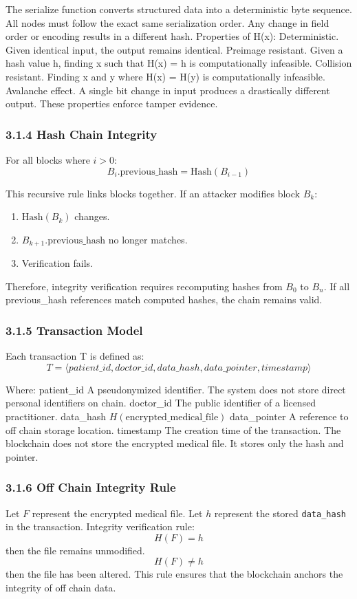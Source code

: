 The serialize function converts structured data into a deterministic byte sequence.
All nodes must follow the exact same serialization order.
Any change in field order or encoding results in a different hash.
Properties of H(x):
Deterministic.
Given identical input, the output remains identical.
Preimage resistant.
Given a hash value h, finding x such that H(x) = h is computationally infeasible.
Collision resistant.
Finding x and y where H(x) = H(y) is computationally infeasible.
Avalanche effect.
A single bit change in input produces a drastically different output.
These properties enforce tamper evidence.

\subsubsection*{3.1.4 Hash Chain Integrity}
For all blocks where $i > 0$:
\[
B_i.\text{previous\_hash} = \mathrm{Hash}(B_{i-1})
\]

This recursive rule links blocks together.
If an attacker modifies block $B_k$:
\begin{enumerate}
\item $\mathrm{Hash}(B_k)$ changes.
\item $B_{k+1}.\text{previous\_hash}$ no longer matches.
\item Verification fails.
\end{enumerate}

Therefore, integrity verification requires recomputing hashes from $B_0$ to $B_n$.
If all previous_hash references match computed hashes, the chain remains valid.

\subsubsection*{3.1.5 Transaction Model}
Each transaction T is defined as:
\[
T = \langle patient\_id, doctor\_id, data\_hash, data\_pointer, timestamp \rangle
\]

Where:
patient_id
A pseudonymized identifier. The system does not store direct personal identifiers on chain.
doctor_id
The public identifier of a licensed practitioner.
data_hash
$H(\text{encrypted\_medical\_file})$
data_pointer
A reference to off chain storage location.
timestamp
The creation time of the transaction.
The blockchain does not store the encrypted medical file.
It stores only the hash and pointer.

\subsubsection*{3.1.6 Off Chain Integrity Rule}
Let $F$ represent the encrypted medical file.
Let $h$ represent the stored \texttt{data\_hash} in the transaction.
Integrity verification rule:
\[
H(F) = h
\]
then the file remains unmodified.
\[
H(F) \neq h
\]
then the file has been altered.
This rule ensures that the blockchain anchors the integrity of off chain data.


